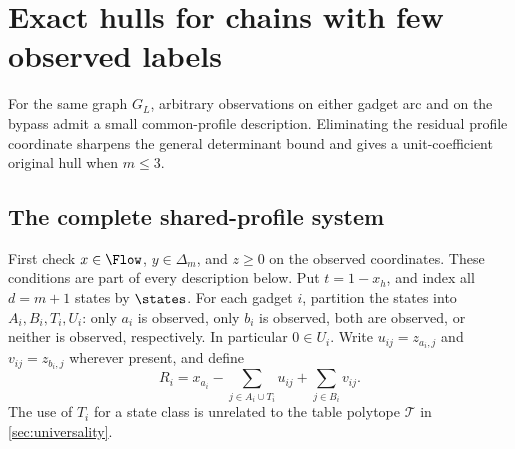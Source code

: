 \section{Exact hulls for chains with few observed labels}\label{sec:fixed-chains}

For the same graph $G_L$, arbitrary observations on either gadget arc
and on the bypass admit a small common-profile description. Eliminating
the residual profile coordinate sharpens the general determinant bound
and gives a unit-coefficient original hull when $m\le3$.

\subsection{The complete shared-profile system}

First check $x\in\Flow$, $y\in\Delta_m$, and $z\ge0$ on the
observed coordinates. These conditions are part of every description
below. Put $t=1-x_h$, and index all $d=m+1$ states by $\states$.
For each gadget $i$, partition the states into $A_i,B_i,T_i,U_i$:
only $a_i$ is observed, only $b_i$ is observed, both are observed,
or neither is observed, respectively. In particular $0\in U_i$.
Write $u_{ij}=z_{a_i,j}$ and $v_{ij}=z_{b_i,j}$ wherever present,
and define
\begin{equation}\label{eq:chain-R}
 R_i=x_{a_i}-\sum_{j\in A_i\cup T_i}u_{ij}
                  +\sum_{j\in B_i}v_{ij}.
\end{equation}
The use of $T_i$ for a state class is unrelated to the table polytope
$\mathcal T$ in \cref{sec:universality}.

